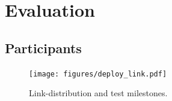 \documentclass[nofilelist,dvipsnames]{cslthse-msc}
\begin{document}
%
%
%
%
%
%
%
%
	\chapter{Evaluation}

	  \section{Participants}

      \begin{figure}[h!]
        \centering
        \texttt{[image: figures/deploy\_link.pdf]}
        \caption{Link-distribution and test milestones.}
      \end{figure}
\end{document}
